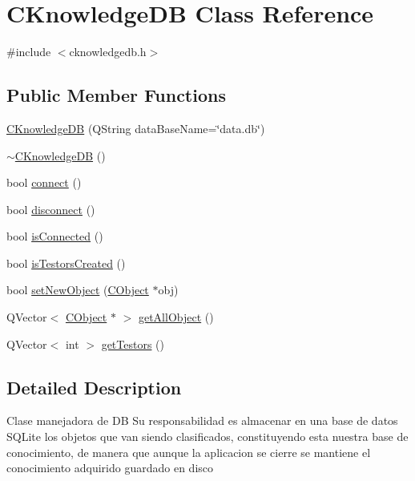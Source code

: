 \hypertarget{class_c_knowledge_d_b}{\section{C\-Knowledge\-D\-B Class Reference}
\label{class_c_knowledge_d_b}
}


{\ttfamily \#include $<$cknowledgedb.\-h$>$}

\subsection*{Public Member Functions}
\begin{DoxyCompactItemize}
\item 
\hyperlink{class_c_knowledge_d_b_aace4e2aa0af456566b015fe0f9f05ccc}{C\-Knowledge\-D\-B} (Q\-String data\-Base\-Name=\char`\"{}data.\-db\char`\"{})
\item 
\hyperlink{class_c_knowledge_d_b_a2c9e424a936755fa1f98db066c6ae977}{$\sim$\-C\-Knowledge\-D\-B} ()
\item 
bool \hyperlink{class_c_knowledge_d_b_a03894b1d7152b983453167ac8220f88c}{connect} ()
\item 
bool \hyperlink{class_c_knowledge_d_b_a88b0d2e34d235fa1c001d84e1621bce1}{disconnect} ()
\item 
bool \hyperlink{class_c_knowledge_d_b_afa772e6e967958f924c9eb1576270806}{is\-Connected} ()
\item 
bool \hyperlink{class_c_knowledge_d_b_a18247b02ce84d9b44fd8382ef64ebb70}{is\-Testors\-Created} ()
\item 
bool \hyperlink{class_c_knowledge_d_b_a058a0dcd66111b9a61608dae0c5ad8f0}{set\-New\-Object} (\hyperlink{class_c_object}{C\-Object} $\ast$obj)
\item 
Q\-Vector$<$ \hyperlink{class_c_object}{C\-Object} $\ast$ $>$ \hyperlink{class_c_knowledge_d_b_acb892ba68c7679050b0933fe4b4b1720}{get\-All\-Object} ()
\item 
Q\-Vector$<$ int $>$ \hyperlink{class_c_knowledge_d_b_a2f33bef40c3c18911153f30a590d92b1}{get\-Testors} ()
\end{DoxyCompactItemize}


\subsection{Detailed Description}
Clase manejadora de D\-B Su responsabilidad es almacenar en una base de datos S\-Q\-Lite los objetos que van siendo clasificados, constituyendo esta nuestra base de conocimiento, de manera que aunque la aplicacion se cierre se mantiene el conocimiento adquirido guardado en disco 

